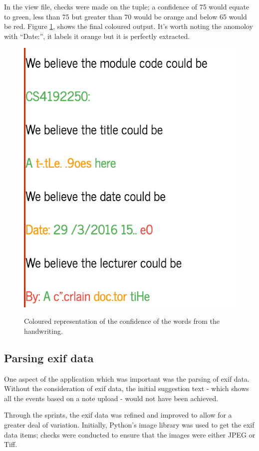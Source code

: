 In the view file, checks were made on the tuple; a confidence of 75 would equate to green, less than 75 but greater than 70 would be orange and below 65 would be red. Figure \ref{fig:tesseract_colour}, shows the final coloured output. It's worth noting the anomoloy with ``Date:'', it labels it orange but it is perfectly extracted.
\begin{figure}[H]
  \centering
  \includegraphics{images/tesseract_colour}
  \label{fig:tesseract_colour}
  \caption{Coloured representation of the confidence of the words from the handwriting.}
\end{figure}

\subsection{Parsing exif data}
One aspect of the application which was important was the parsing of exif data. Without the consideration of exif data, the initial suggestion text - which shows all the events based on a note upload - would not have been achieved.

Through the sprints, the exif data was refined and improved to allow for a greater deal of variation. Initially, Python's image library was used to get the exif data items; checks were conducted to ensure that the images were either JPEG or Tiff.

